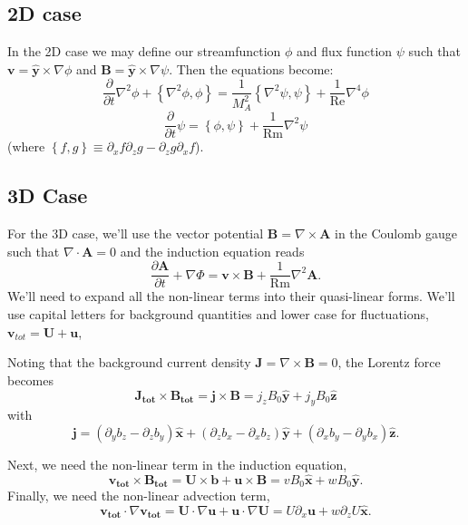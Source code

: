 \documentclass[aps,pop,preprint]{revtex4}
\newcommand{\Rm}{\mathrm{Rm}}
\newcommand{\xhat}{\hat{\mathbf{x}}}
\newcommand{\yhat}{\hat{\mathbf{y}}}
\newcommand{\zhat}{\hat{\mathbf{z}}}
\begin{document}
	\subsection{2D case} \label{derivation:subsec:2d}
	In the 2D case we may define our streamfunction $\phi$ and flux function $\psi$ such that $\mathbf{v} = \hat{\mathbf{y}} \times \nabla \phi$ and $\mathbf{B} = \hat{\mathbf{y}} \times \nabla \psi$. 
	Then the equations become:
\begin{equation}
\frac{\partial}{\partial t} \nabla^2 \phi + \left\{\nabla^2 \phi, \phi \right\} = \frac{1}{M_A^2}\left\{\nabla^2 \psi, \psi \right\} + \frac{1}{\mathrm{Re}}\nabla^4 \phi
\end{equation}
\begin{equation}
\frac{\partial}{\partial t} \psi = \left\{ \phi, \psi \right\} + \frac{1}{\mathrm{Rm}}\nabla^2 \psi
\end{equation}
(where $\left\{f, g\right\} \equiv \partial_x f \partial_z g - \partial_z g \partial_x f$).
\subsection{3D Case}
For the 3D case, we'll use the vector potential $\mathbf{B} = \nabla \times \mathbf{A}$ in the Coulomb gauge such that $\nabla \cdot \mathbf{A} = 0$ and the induction equation reads
	\begin{equation}
	\frac{\partial  \mathbf{A}}{\partial t} + \nabla \Phi = \mathbf{v} \times \mathbf{B} + \frac{1}{\Rm} \nabla^2 \mathbf{A}.
	\end{equation}
We'll need to expand all the non-linear terms into their quasi-linear forms. We'll use capital letters for background quantities and lower case for fluctuations, $\mathbf{v}_{tot} = \mathbf{U} + \mathbf{u}$,

Noting that the background current density $\mathbf{J} = \nabla \times \mathbf{B} = 0$, the Lorentz force becomes
\begin{equation}
    \mathbf{J_{tot} \times B_{tot}} = \mathbf{j \times B} = j_z B_0 \yhat + j_y B_0 \zhat
\end{equation}
with
\begin{equation}
    \mathbf{j} =  (\partial_y b_z - \partial_z b_y) \xhat + (\partial_z b_x - \partial_x b_z) \yhat + (\partial_x b_y - \partial_y b_x) \zhat.
\end{equation}

Next, we need the non-linear term in the induction equation, 
\begin{equation}
    \mathbf{v_{tot} \times B_{tot}} = \mathbf{U \times b} + \mathbf {u \times B} = v B_0 \xhat + w B_0 \yhat.
\end{equation}
Finally, we need the non-linear advection term,
\begin{equation}
    \mathbf{v_{tot}}\cdot \nabla \mathbf{v_{tot}} = \mathbf{U} \cdot \nabla \mathbf{u} + \mathbf{u} \cdot \nabla \mathbf{U} = U \partial_x \mathbf{u} + w \partial_z U \xhat.
\end{equation}
\end{document}
